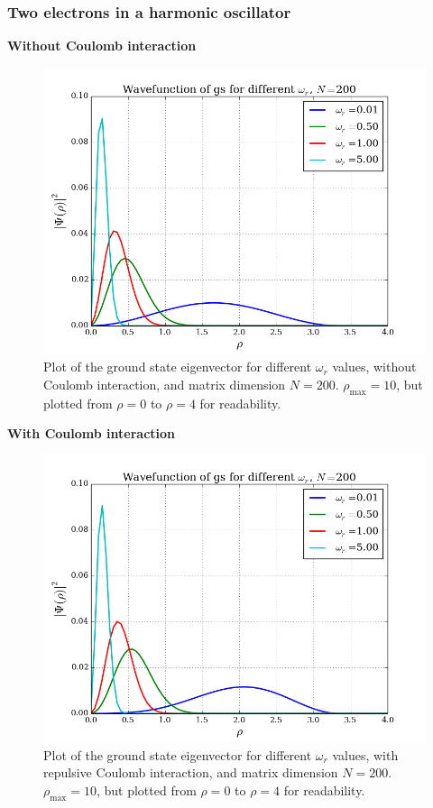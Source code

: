 \documentclass{article}
\begin{document}
\subsubsection{Two electrons in a harmonic oscillator}
\textbf{Without Coulomb interaction}
\begin{figure}[H]
  \centering
  \includegraphics[scale=0.47]{../figures/eigvec_two-noint_n200.png}
  \caption{Plot of the ground state eigenvector for different $\omega_r$ values, without Coulomb interaction, and matrix dimension $N=200$. $\rho_{\text{max}} = 10$, but plotted from $\rho = 0$ to $\rho = 4$ for readability.}
  \label{fig:eigvec_noint_200}
\end{figure}
\textbf{With Coulomb interaction}
\begin{figure}[H]
  \centering
  \includegraphics[scale=0.47]{../figures/eigvec_two-int_n200.png}
  \caption{Plot of the ground state eigenvector for different $\omega_r$ values, with repulsive Coulomb interaction, and matrix dimension $N=200$. $\rho_{\text{max}} = 10$, but plotted from $\rho = 0$ to $\rho = 4$ for readability.}
  \label{fig:eigvec_int_200}
\end{figure}
\end{document}
